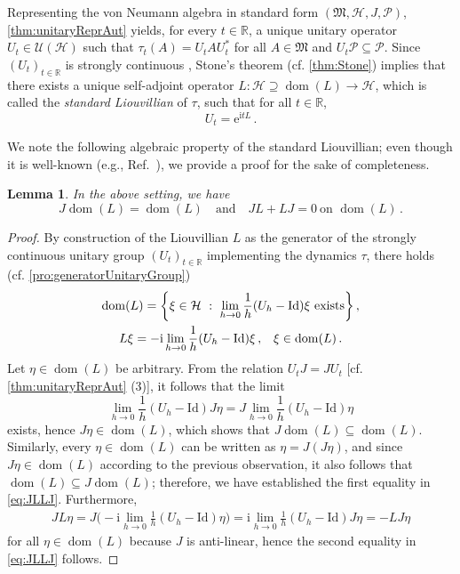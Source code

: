 \documentclass[a4paper, twoside, 11pt, reqno]{amsart}
\theoremstyle{definition}
\theoremstyle{plain}
\newtheorem{lemma}[definition]{Lemma}
\renewcommand{\subset}{\subseteq}
\renewcommand{\supset}{\supseteq}
\let\originalleft\left
\let\originalright\right
\renewcommand{\left}{\mathopen{}\mathclose\bgroup\originalleft}
\renewcommand{\right}{\aftergroup\egroup\originalright}
\newcommand{\R}{\mathbb{R}}
\newcommand{\MH}{\mathcal{H}}
\newcommand{\MFM}{\mathfrak{M}}
\newcommand{\ii}{\mathrm{i}}
\newcommand{\ee}{\mathrm{e}}
\newcommand{\UO}{\mathscr{U}}
\newcommand{\NPC}{\mathcal{P}}
\newcommand{\id}{\mathrm{Id}}
\newcommand{\1}{\mathbf{1}}
\DeclareMathOperator{\dom}{dom}
\newcommand{\Set}[1]{\left\{#1\right\}}
\newcommand{\com}{{\, , \quad}}
\begin{document}
Representing the von Neumann algebra in standard form $(\MFM, \MH, J, \NPC)$, \cref{thm:unitaryReprAut} yields, for every $t \in \R$, a unique unitary operator $U_t \in \UO(\MH)$ such that $\tau_t(A) = U_t A U_t^\ast$ for all $A \in \MFM$ and $U_t \NPC \subset \NPC$. Since $(U_t)_{t \in \R}$ is strongly continuous \cite[p. 149]{Pillet2006}, Stone's theorem (cf. \cref{thm:Stone}) implies that there exists a unique self-adjoint operator $L : \MH \supset \dom(L) \to \MH$, which is called the \emph{standard Liouvillian} of $\tau$, such that for all $t \in \R$,
\begin{equation*}
    U_t = \ee^{\ii t L} \, .
\end{equation*}

We note the following algebraic property of the standard Liouvillian; even though it is well-known (e.g., Ref.~\cite[Eq. (29)]{Pillet2006}), we provide a proof for the sake of completeness.

\begin{lemma}\label{lem:JLLJ}
    In the above setting, we have
    \begin{equation}\label{eq:JLLJ}
        J \dom(L) = \dom(L) \quad \text{and} \quad J L + L J = 0 \ \text{on $\dom(L)$} \, .
    \end{equation}
\end{lemma}

\begin{proof}
    By construction of the Liouvillian $L$ as the generator of the strongly continuous unitary group $(U_t)_{t \in \R}$ implementing the dynamics $\tau$, there holds (cf. \cref{pro:generatorUnitaryGroup})
    \begin{gather*}
        \dom(L) = \Set{\xi \in \MH \ : \ \lim_{h \to 0} \frac{1}{h} (U_h - \id) \xi \ \text{exists}} \, , \\
        L \xi = - \ii \lim_{h \to 0} \frac{1}{h} (U_h - \id) \xi \com \xi \in \dom(L) \, .
    \end{gather*}
    Let $\eta \in \dom(L)$ be arbitrary. From the relation $U_t J = J U_t$ [cf. \cref{thm:unitaryReprAut} (3)], it follows that the limit
    \begin{equation*}
        \lim_{h \to 0} \frac{1}{h} (U_h - \id) J \eta = J \lim_{h \to 0} \frac{1}{h} (U_h - \id) \eta
    \end{equation*}
    exists, hence $J \eta \in \dom(L)$, which shows that $J \dom(L) \subset \dom(L)$. Similarly, every $\eta \in \dom(L)$ can be written as $\eta = J (J \eta)$, and since $J \eta \in \dom(L)$ according to the previous observation, it also follows that $\dom(L) \subset J \dom(L)$; therefore, we have established the first equality in \eqref{eq:JLLJ}. Furthermore,
    \begin{align*}
        J L \eta = J \biggl(- \ii \lim_{h \to 0} \frac{1}{h} (U_h - \id) \eta\biggr) = \ii \lim_{h \to 0} \frac{1}{h} (U_h - \id) J \eta = - L J \eta
    \end{align*}
    for all $\eta \in \dom(L)$ because $J$ is anti-linear, hence the second equality in \eqref{eq:JLLJ} follows.
\end{proof}
\end{document}
